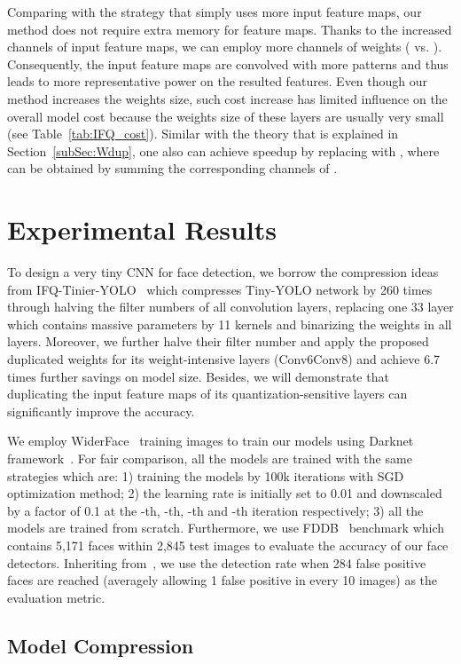 \documentclass[10pt,twocolumn,letterpaper]{article}
\begin{document}
Comparing  with the strategy that simply uses more input feature maps, our method does not require extra memory for feature maps. Thanks to the increased channels of input feature maps, we can employ more channels of weights ( vs. ). Consequently, the input feature maps are convolved with more patterns and thus leads to more representative power on the resulted features. Even though our method increases the weights size, such cost increase has limited influence on the overall model cost because the weights size of these layers are usually very small (see Table~\ref{tab:IFQ_cost}). Similar with the theory that is explained in Section~\ref{subSec:Wdup}, one also can achieve speedup by replacing   with ,  where  can be obtained by summing the corresponding channels of .

\section{Experimental Results}

To design a very tiny CNN for face detection, we borrow the compression ideas from IFQ-Tinier-YOLO~\cite{IFQNet} which compresses Tiny-YOLO network by 260 times through halving the filter numbers of all convolution layers, replacing one 33 layer which contains massive parameters by 11 kernels and binarizing the weights in all layers. Moreover, we further halve their filter number and apply the proposed duplicated weights for its weight-intensive layers (Conv6Conv8) and achieve 6.7 times further savings on model size. Besides, we will demonstrate that duplicating the input feature maps of its quantization-sensitive layers can significantly improve the accuracy.

We employ WiderFace~\cite{widerface} training images to train our models using Darknet framework~\cite{darknet}. For fair comparison, all the models are trained with the same strategies which are: 1) training the models by 100k iterations with SGD optimization method; 2) the learning rate is initially set to 0.01 and downscaled by a factor of 0.1 at the -th, -th, -th and -th iteration respectively; 3) all the models are trained from scratch. Furthermore, we use FDDB~\cite{FDDB} benchmark which contains 5,171 faces within 2,845 test images to evaluate the accuracy of our face detectors. Inheriting from~\cite{IFQNet}, we use the detection rate when 284 false positive faces are reached (averagely allowing 1 false positive in every 10 images) as the evaluation metric.


\subsection{Model Compression} \label{subsec:exp-Wdup}
\end{document}
